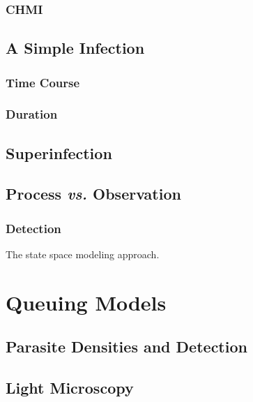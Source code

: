 \documentclass[
]{book}
\begin{document}
\subsection{CHMI}\label{chmi}

\section{A Simple Infection}\label{a-simple-infection}

\subsection{Time Course}\label{time-course}

\subsection{Duration}\label{duration}

\section{Superinfection}\label{superinfection-2}

\section{\texorpdfstring{Process \emph{vs.} Observation}{Process vs. Observation}}\label{process-vs.-observation}

\subsection{Detection}\label{detection}

The state space modeling approach.

\chapter{Queuing Models}\label{queuing-models}

\section{Parasite Densities and Detection}\label{parasite-densities-and-detection}

\section{Light Microscopy}\label{light-microscopy}
\end{document}
